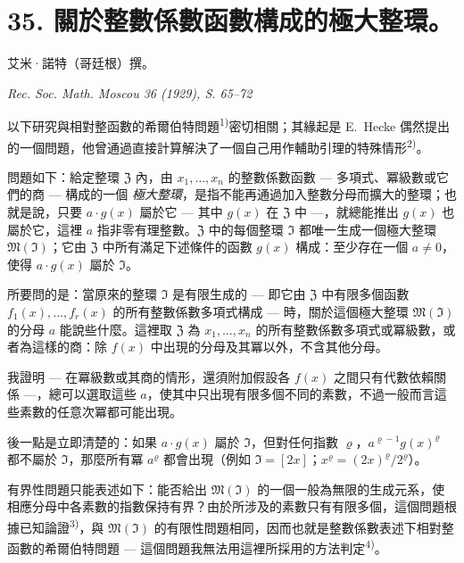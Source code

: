 \documentclass[11pt]{article}
\begin{document}
\setcounter{footnote}{0}
\section*{35. 關於整數係數函數構成的極大整環。}

\begin{center}
艾米·諾特（哥廷根）撰。\par
\emph{Rec. Soc. Math. Moscou 36 (1929), S. 65--72}
\end{center}




以下研究與相對整函數的希爾伯特問題\textsuperscript{1)}密切相關；其緣起是 E.\ Hecke 偶然提出的一個問題，他曾通過直接計算解決了一個自己用作輔助引理的特殊情形\textsuperscript{2)}。

問題如下：給定整環 $\mathfrak{Z}$ 內，由 $x_1,\ldots,x_n$ 的整數係數函數 --- 多項式、冪級數或它們的商 --- 構成的一個 \textit{極大整環}，是指不能再通過加入整數分母而擴大的整環；也就是說，只要 $a \cdot g(x)$ 屬於它 --- 其中 $g(x)$ 在 $\mathfrak{Z}$ 中 ---，就總能推出 $g(x)$ 也屬於它，這裡 $a$ 指非零有理整數。$\mathfrak{Z}$ 中的每個整環 $\mathfrak{I}$ 都唯一生成一個極大整環 $\mathfrak{M}(\mathfrak{I})$；它由 $\mathfrak{Z}$ 中所有滿足下述條件的函數 $g(x)$ 構成：至少存在一個 $a \neq 0$，使得 $a \cdot g(x)$ 屬於 $\mathfrak{I}$。

所要問的是：當原來的整環 $\mathfrak{I}$ 是有限生成的 --- 即它由 $\mathfrak{Z}$ 中有限多個函數 $f_1(x),\ldots,f_r(x)$ 的所有整數係數多項式構成 --- 時，關於這個極大整環 $\mathfrak{M}(\mathfrak{I})$ 的分母 $a$ 能說些什麼。這裡取 $\mathfrak{Z}$ 為 $x_1,\ldots,x_n$ 的所有整數係數多項式或冪級數，或者為這樣的商：除 $f(x)$ 中出現的分母及其冪以外，不含其他分母。

我證明 --- 在冪級數或其商的情形，還須附加假設各 $f(x)$ 之間只有代數依賴關係 ---，總可以選取這些 $a$，使其中只出現有限多個不同的素數，不過一般而言這些素數的任意次冪都可能出現。

後一點是立即清楚的：如果 $a\cdot g(x)$ 屬於 $\mathfrak{I}$，但對任何指數 $\varrho$，$a^{\varrho-1}g(x)^{\varrho}$ 都不屬於 $\mathfrak{I}$，那麼所有冪 $a^{\varrho}$ 都會出現（例如 $\mathfrak{I}=[2x]$；$x^{\varrho}=(2x)^{\varrho}/2^{\varrho}$）。

有界性問題只能表述如下：能否給出 $\mathfrak{M}(\mathfrak{I})$ 的一個一般為無限的生成元系，使相應分母中各素數的指數保持有界？由於所涉及的素數只有有限多個，這個問題根據已知論證\textsuperscript{3)}，與 $\mathfrak{M}(\mathfrak{I})$ 的有限性問題相同，因而也就是整數係數表述下相對整函數的希爾伯特問題 --- 這個問題我無法用這裡所採用的方法判定\textsuperscript{4)}。
\end{document}
